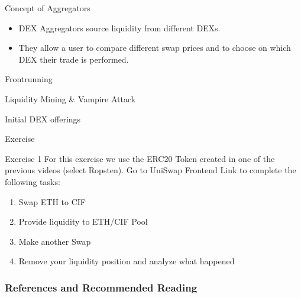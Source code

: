 \documentclass[]{beamer}
\begin{document}
\begin{frame}{Concept of Aggregators}

\begin{figure}
	\centering
	\resizebox{0.8\textwidth}{!}{
	\begin{tikzpicture}[scale=1.0, every node/.style={scale=1.0}]
			
	\end{tikzpicture}}
\end{figure}
	
\begin{itemize}
	\item DEX Aggregators source liquidity from different DEXs.
	\item They allow a user to compare different swap prices and to choose on which DEX their trade is performed.
\end{itemize}

\end{frame}


\begin{frame}{Frontrunning}

\end{frame}


\begin{frame}{Liquidity Mining \& Vampire Attack}
	\begin{figure}[h!]
		\begin{center}
			
		\end{center}
	\end{figure}
\end{frame}


\begin{frame}{Initial DEX offerings}

\end{frame}


\begin{frame}{Exercise}
	\begin{exercise}{Exercise 1}
	For this exercise we use the ERC20 Token created in one of the previous videos (select Ropsten). Go to UniSwap Frontend Link to complete the following tasks:
	
		\begin{enumerate}
			\item Swap ETH to CIF
			\item Provide liquidity to ETH/CIF Pool
			\item Make another Swap
			\item Remove your liquidity position and analyze what happened
		\end{enumerate}
	\end{exercise}
\end{frame}



\begin{frame}%
\frametitle{References and Recommended Reading}
	
	
	
\end{frame}
\end{document}
